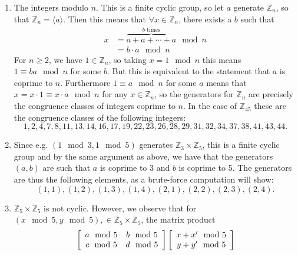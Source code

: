 \documentclass{article}
\begin{document}
\begin{Answer}
\begin{enumerate}
  \item{The integers modulo $n$. This is a finite cyclic group, so let
        $a$ generate $\mathbb{Z}_n$, so
        that $\mathbb{Z}_n = \langle a \rangle$. Then this means that
        $\forall x \in \mathbb{Z}_n$, there exists a $b$ such that
       \begin{align*}
        x 
        &=
          \overbrace{a + a + \cdots + a}^{b \text{ times}} \mod n \\
        &=
          b \cdot a \mod n
        \end{align*}
        For $n \geq 2$, we have $1 \in \mathbb{Z}_n$, so taking $x =
        1 \mod n$ this means
        $1 \equiv b a \mod n$ for some $b$. But this is equivalent to
        the statement that $a$ is coprime to $n$. Furthermore
        $1 \equiv a \mod n$ for some $a$ means that
        $x = x \cdot 1 \equiv x \cdot a \mod n$ for any 
        $x \in \mathbb{Z}_n$, so the generators for $\mathbb{Z}_n$ are
        precisely the congruence classes of integers coprime to
        $n$. In the case of $\mathbb{Z}_{45}$ these are the congruence
        classes of the following integers:
        $$
        1, 2, 4, 7, 8, 11, 13, 14, 16, 17, 19, 22, 23, 26, 28, 29,
        31, 32, 34, 37, 38, 41, 43, 44.
        $$
      }
  \item{Since e.g. $(1 \mod 3, 1 \mod 5)$ generates 
        $\mathbb{Z}_3 \times \mathbb{Z}_5$, this is a finite cyclic
        group and by the same argument as above, we have that the
        generators $(a, b)$ are such that $a$ is coprime to 3 and
        $b$ is coprime to 5. The generators are thus the 
        following elements, as a brute-force computation will show:
        $$
        (1,1),(1,2),(1,3),(1,4),(2,1),(2,2),(2,3),(2,4).
        $$
       }
  \item{$\mathbb{Z}_5 \times \mathbb{Z}_5$ is not cyclic. However, we
        observe that for 
        $(x \mod 5, y \mod 5),
        \in \mathbb{Z}_5 \times \mathbb{Z}_5$, the matrix product
        \begin{align*}
        &\left[\begin{array}{c c}
           a \mod 5 & b \mod 5 \\
           c \mod 5 & d \mod 5
         \end{array}\right]
         \left[\begin{array}{c}
           x + x^\prime \mod 5 \\ y + y^\prime \mod 5
         \end{array}\right] \\

\end{align*}}
\end{enumerate}
\end{Answer}
\end{document}

